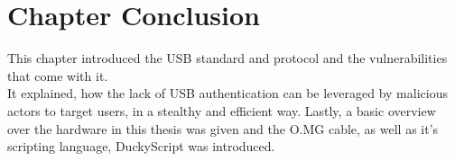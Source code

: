 \section{Chapter Conclusion}

This chapter introduced the USB standard and protocol and the vulnerabilities that come with it. \\
It explained, how the lack of USB authentication can be leveraged by malicious actors to target users, in a stealthy and efficient way. 
Lastly, a basic overview over the hardware in this thesis was given and the O.MG cable, as well as it's scripting language, DuckyScript was introduced. 